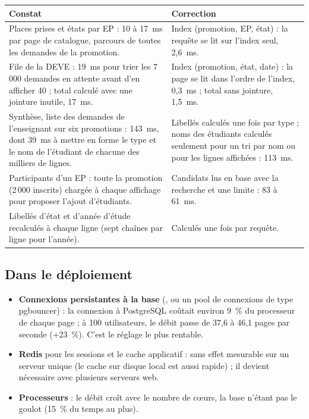 \documentclass[11pt,a4paper]{article}
\newcommand{\code}[1]{\texttt{\detokenize{#1}}}
\begin{document}
\begin{longtable}{@{}p{5.2cm}p{10.4cm}@{}}
\toprule
\textbf{Constat} & \textbf{Correction} \\
\midrule\endhead
Places prises et états par EP : 10 à 17~ms par page de catalogue, parcours de toutes les demandes
  de la promotion. & Index (promotion, EP, état) : la requête se lit sur l'index seul, 2,6~ms. \\
File de la DEVE : 19~ms pour trier les 7\,000 demandes en attente avant d'en afficher 40 ; total
  calculé avec une jointure inutile, 17~ms. & Index (promotion, état, date) : la page se lit dans
  l'ordre de l'index, 0,3~ms ; total sans jointure, 1,5~ms. \\
Synthèse, liste des demandes de l'enseignant sur six promotions : 143~ms, dont 39~ms à mettre en
  forme le type et le nom de l'étudiant de chacune des milliers de lignes. & Libellés calculés une
  fois par type ; noms des étudiants calculés seulement pour un tri par nom ou pour les lignes
  affichées : 113~ms. \\
Participants d'un EP : toute la promotion (2\,000 inscrits) chargée à chaque affichage pour
  proposer l'ajout d'étudiants. & Candidats lus en base avec la recherche et une limite : 83 à
  61~ms. \\
Libellés d'état et d'année d'étude recalculés à chaque ligne (sept chaînes par ligne pour
  l'année). & Calculés une fois par requête. \\
\bottomrule
\end{longtable}

\subsection{Dans le déploiement}

\begin{itemize}
  \item \textbf{Connexions persistantes à la base} (\code{$CFG->dboptions['dbpersist'] = 1}, ou un
    pool de connexions de type pgbouncer) : la connexion à PostgreSQL coûtait environ 9~\% du
    processeur de chaque page ; à 100 utilisateurs, le débit passe de 37,6 à 46,1 pages par seconde
    (+23~\%). C'est le réglage le plus rentable.
  \item \textbf{Redis} pour les sessions et le cache applicatif : sans effet mesurable sur un
    serveur unique (le cache sur disque local est aussi rapide) ; il devient nécessaire avec
    plusieurs serveurs web.
  \item \textbf{Processeurs} : le débit croît avec le nombre de c\oe urs, la base n'étant pas le
    goulot (15~\% du temps au plus).
\end{itemize}
\end{document}
